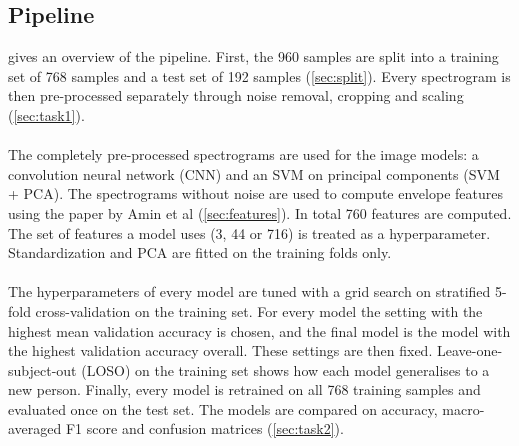 \documentclass[10pt,a4paper,titlepage]{article}
\begin{document}
\subsection{Pipeline}
 gives an overview of the pipeline. First, the 960 samples are split into a training set of 768 samples and a test set of 192 samples (\cref{sec:split}). Every spectrogram is then pre-processed separately through noise removal, cropping and scaling (\cref{sec:task1}).
\\\\
The completely pre-processed spectrograms are used for the image models: a convolution neural network (CNN) and an SVM on principal components (SVM + PCA). The spectrograms without noise are used to compute envelope features using the paper by Amin et al (\cref{sec:features}). In total 760 features are computed. The set of features a model uses (3, 44 or 716) is treated as a hyperparameter. Standardization and PCA are fitted on the training folds only. 
\\\\
The hyperparameters of every model are tuned with a grid search on stratified 5-fold cross-validation on the training set. For every model the setting with the highest mean validation accuracy is chosen, and the final model is the model with the highest validation accuracy overall. These settings are then fixed. Leave-one-subject-out (LOSO) on the training set shows how each model generalises to a new person. Finally, every model is retrained on all 768 training samples and evaluated once on the test set. The models are compared on accuracy, macro-averaged F1 score and confusion matrices (\cref{sec:task2}).
\end{document}

